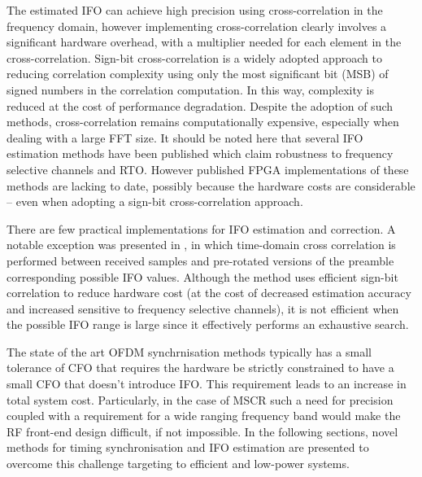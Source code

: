 The estimated IFO can achieve high precision using cross-correlation in the frequency domain,
however implementing cross-correlation clearly involves a significant hardware overhead, with a multiplier needed for each element in the cross-correlation.
Sign-bit cross-correlation \cite{Schwoerer2002} is a widely adopted approach to reducing correlation complexity using only the most significant bit (MSB) of signed numbers in the correlation computation. In this way, complexity is reduced at the cost of performance degradation.
Despite the adoption of such methods, cross-correlation remains computationally expensive, especially when dealing with a large FFT size.
It should be noted here that several IFO estimation methods have been published which claim robustness to frequency selective channels and RTO. However published FPGA implementations of these methods are lacking to date, possibly because the hardware costs are considerable -- even when adopting a sign-bit cross-correlation approach.%

There are few practical implementations for IFO estimation and correction. 
A notable exception was presented in \cite{Kim2008}, in which time-domain cross correlation is performed between received samples and pre-rotated versions of the
preamble corresponding possible IFO values. Although the method uses efficient sign-bit correlation to reduce hardware cost (at the cost of decreased estimation accuracy and increased sensitive to frequency
selective channels), it is not efficient when the possible IFO range is large since it effectively performs an exhaustive search.

The state of the art OFDM synchrnisation methods typically has a small tolerance of CFO that requires the hardware be strictly constrained to have a small CFO that doesn't introduce IFO.
This requirement leads to an increase in total system cost. Particularly, in the case of MSCR such a need for precision coupled with a requirement for a wide ranging frequency band would make the RF front-end design difficult, if not impossible.
In the following sections, novel methods for timing synchronisation and IFO estimation are presented to overcome this challenge targeting to efficient and low-power systems.


